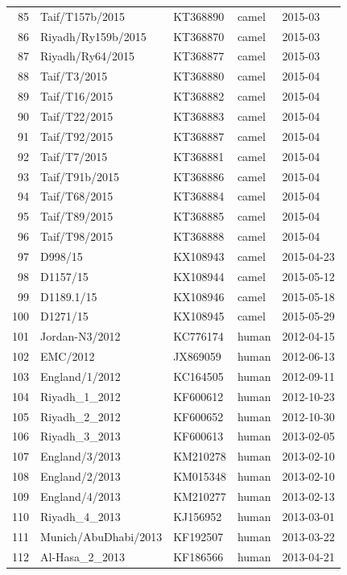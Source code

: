 \documentclass[9pt,lineno]{elife}
\begin{document}
\begin{longtable}{ | r | l | p{2cm} | l | l | }
  85 & Taif/T157b/2015 & KT368890 & camel & 2015-03 \\
  86 & Riyadh/Ry159b/2015 & KT368870 & camel & 2015-03 \\
  87 & Riyadh/Ry64/2015 & KT368877 & camel & 2015-03 \\
  88 & Taif/T3/2015 & KT368880 & camel & 2015-04 \\
  89 & Taif/T16/2015 & KT368882 & camel & 2015-04 \\
  90 & Taif/T22/2015 & KT368883 & camel & 2015-04 \\
  91 & Taif/T92/2015 & KT368887 & camel & 2015-04 \\
  92 & Taif/T7/2015 & KT368881 & camel & 2015-04 \\
  93 & Taif/T91b/2015 & KT368886 & camel & 2015-04 \\
  94 & Taif/T68/2015 & KT368884 & camel & 2015-04 \\
  95 & Taif/T89/2015 & KT368885 & camel & 2015-04 \\
  96 & Taif/T98/2015 & KT368888 & camel & 2015-04 \\
  97 & D998/15 & KX108943 & camel & 2015-04-23 \\
  98 & D1157/15 & KX108944 & camel & 2015-05-12 \\
  99 & D1189.1/15 & KX108946 & camel & 2015-05-18 \\
  100 & D1271/15 & KX108945 & camel & 2015-05-29 \\
  101 & Jordan-N3/2012 & KC776174 & human & 2012-04-15 \\
  102 & EMC/2012 & JX869059 & human & 2012-06-13 \\
  103 & England/1/2012 & KC164505 & human & 2012-09-11 \\
  104 & Riyadh\_1\_2012 & KF600612 & human & 2012-10-23 \\
  105 & Riyadh\_2\_2012 & KF600652 & human & 2012-10-30 \\
  106 & Riyadh\_3\_2013 & KF600613 & human & 2013-02-05 \\
  107 & England/3/2013 & KM210278 & human & 2013-02-10 \\
  108 & England/2/2013 & KM015348 & human & 2013-02-10 \\
  109 & England/4/2013 & KM210277 & human & 2013-02-13 \\
  110 & Riyadh\_4\_2013 & KJ156952 & human & 2013-03-01 \\
  111 & Munich/AbuDhabi/2013 & KF192507 & human & 2013-03-22 \\
  112 & Al-Hasa\_2\_2013 & KF186566 & human & 2013-04-21 \\

\end{longtable}
\end{document}
